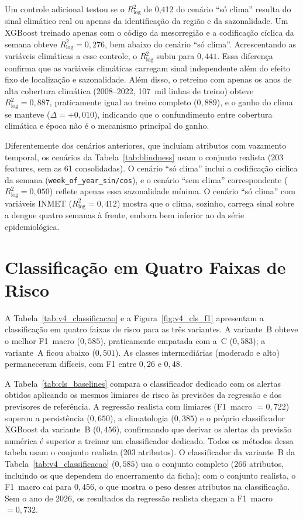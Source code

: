 Um controle adicional testou se o $R^2_{\log}$ de 0,412 do cenário ``só clima'' resulta do sinal climático real ou apenas da identificação da região e da sazonalidade. Um XGBoost treinado apenas com o código da mesorregião e a codificação cíclica da semana obteve $R^2_{\log}=0{,}276$, bem abaixo do cenário ``só clima''. Acrescentando as variáveis climáticas a esse controle, o $R^2_{\log}$ subiu para $0{,}441$. Essa diferença confirma que as variáveis climáticas carregam sinal independente além do efeito fixo de localização e sazonalidade. Além disso, o retreino com apenas os anos de alta cobertura climática (2008--2022, 107~mil linhas de treino) obteve $R^2_{\log}=0{,}887$, praticamente igual ao treino completo ($0{,}889$), e o ganho do clima se manteve ($\Delta=+0{,}010$), indicando que o confundimento entre cobertura climática e época não é o mecanismo principal do ganho.

Diferentemente dos cenários anteriores, que incluíam atributos com vazamento temporal, os cenários da Tabela~\ref{tab:blindness} usam o conjunto realista (203 features, sem as 61 consolidadas). O cenário ``só clima'' inclui a codificação cíclica da semana (\texttt{week\_of\_year\_sin/cos}), e o cenário ``sem clima'' correspondente ($R^2_{\log}=0{,}050$) reflete apenas essa sazonalidade mínima. O cenário ``só clima'' com variáveis INMET ($R^2_{\log}=0{,}412$) mostra que o clima, sozinho, carrega sinal sobre a dengue quatro semanas à frente, embora bem inferior ao da série epidemiológica.



\section{Classificação em Quatro Faixas de Risco}
\label{sec:res_classificacao}

A Tabela~\ref{tab:v4_classificacao} e a Figura~\ref{fig:v4_cls_f1} apresentam a classificação em quatro faixas de risco para as três variantes. A variante~B obteve o melhor F1~macro ($0{,}585$), praticamente empatada com a~C ($0{,}583$); a variante~A ficou abaixo ($0{,}501$). As classes intermediárias (moderado e alto) permaneceram difíceis, com F1 entre $0{,}26$ e $0{,}48$.

A Tabela~\ref{tab:cls_baselines} compara o classificador dedicado com os alertas obtidos aplicando os mesmos limiares de risco às previsões da regressão e dos previsores de referência. A regressão realista com limiares (F1~macro $=0{,}722$) superou a persistência ($0{,}650$), a climatologia ($0{,}385$) e o próprio classificador XGBoost da variante~B ($0{,}456$), confirmando que derivar os alertas da previsão numérica é superior a treinar um classificador dedicado. Todos os métodos dessa tabela usam o conjunto realista (203 atributos). O classificador da variante~B da Tabela~\ref{tab:v4_classificacao} ($0{,}585$) usa o conjunto completo (266 atributos, incluindo os que dependem do encerramento da ficha); com o conjunto realista, o F1~macro cai para $0{,}456$, o que mostra o peso desses atributos na classificação. Sem o ano de 2026, os resultados da regressão realista chegam a F1~macro $=0{,}732$.

